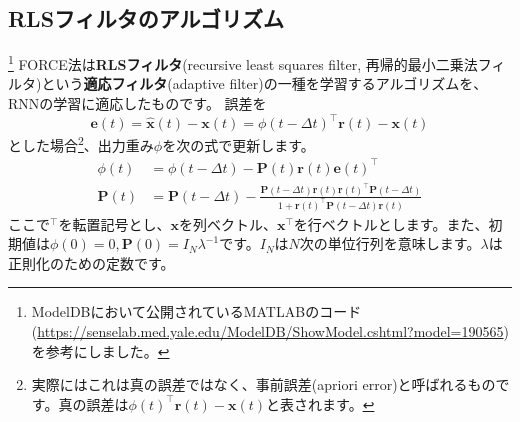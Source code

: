 \subsection{RLSフィルタのアルゴリズム}
\footnote{ModelDBにおいて公開されているMATLABのコード(\url{https://senselab.med.yale.edu/ModelDB/ShowModel.cshtml?model=190565})を参考にしました。}
FORCE法は\textbf{RLSフィルタ}(recursive least squares filter, 再帰的最小二乗法フィルタ)という\textbf{適応フィルタ}(adaptive filter)の一種を学習するアルゴリズムを、RNNの学習に適応したものです。
誤差を 
\begin{equation}
\boldsymbol{e}(t)=\hat{\boldsymbol{x}}(t)-\boldsymbol{x}(t)=\phi(t-\Delta t)^\intercal \boldsymbol{r}(t)-\boldsymbol{x}(t)    
\end{equation}
とした場合\footnote{実際にはこれは真の誤差ではなく、事前誤差(apriori error)と呼ばれるものです。真の誤差は$\phi(t)^\intercal \boldsymbol{r}(t)-\boldsymbol{x}(t)$と表されます。}、出力重み$\phi$を次の式で更新します。
\begin{align}
\phi(t)&=\phi(t-\Delta t)-\boldsymbol{P}(t) \boldsymbol{r}(t)\boldsymbol{e}(t)^\intercal\\
\boldsymbol{P}(t)&=\boldsymbol{P}(t-\Delta t)-\frac{\boldsymbol{P}(t-\Delta t) \boldsymbol{r}(t) \boldsymbol{r}(t)^\intercal \boldsymbol{P}(t-\Delta t)}{1+\boldsymbol{r}(t)^\intercal \boldsymbol{P}(t-\Delta
t) \boldsymbol{r}(t)} 
\end{align}
ここで$^\intercal$を転置記号とし、$\boldsymbol{x}$を列ベクトル、$\boldsymbol{x}^\intercal$を行ベクトルとします。また、初期値は$\phi(0)=0,
\boldsymbol{P}(0)=I_{N}\lambda^{-1}$です。$I_{N}$は$N$次の単位行列を意味します。$\lambda$は正則化のための定数です。
